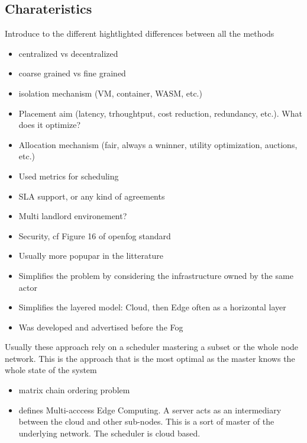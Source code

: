 \documentclass[11pt]{sdm}
\begin{document}
\subsection{Charateristics}
Introduce to the different hightlighted differences between all the methods
\begin{itemize}
    \item centralized vs decentralized
    \item coarse grained vs fine grained
    \item isolation mechanism (VM, container, WASM, etc.)
    \item Placement aim (latency, trhoughtput, cost reduction, redundancy, etc.). What does it optimize?
    \item Allocation mechanism (fair, always a wninner, utility optimization, auctions, etc.)
    \item Used metrics for scheduling
    \item SLA support, or any kind of agreements
    \item Multi landlord environement?
    \item Security, cf Figure 16 of  openfog standard
\end{itemize}
\begin{itemize}
    \item Usually more popupar in the litterature
    \item Simplifies the problem by considering the infrastructure owned by the same actor
    \item Simplifies the layered model: Cloud, then Edge often as a horizontal layer
    \item Was developed and advertised before the Fog
    
\end{itemize}


Usually these approach rely on a scheduler mastering a subset or the whole node network. This is the approach that is the most optimal as the master knows the whole state of the system
\begin{itemize}
    \item matrix chain ordering problem \citet{elgamal_droplet_2018}
    \item {} defines Multi-acccess Edge Computing. A server acts as an intermediary between the cloud and other sub-nodes. This is a sort of master of the underlying network. The scheduler is cloud based.
\end{itemize}
\end{document}
